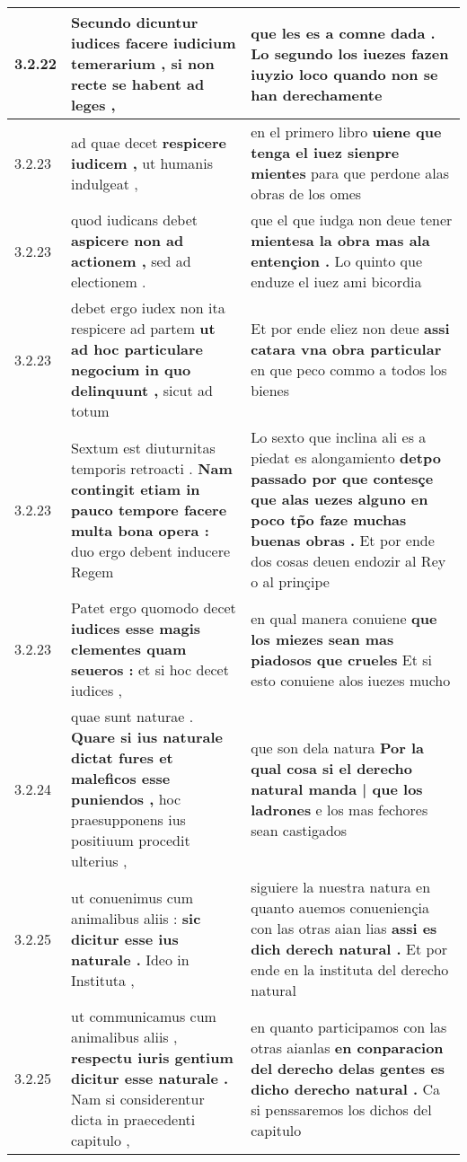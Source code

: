 \begin{tabular}{|p{1cm}|p{6.5cm}|p{6.5cm}|}
3.2.22 & Secundo dicuntur iudices \textbf{ facere iudicium temerarium , } si non recte se habent ad leges , & que les es a comne dada . \textbf{ Lo segundo los iuezes fazen iuyzio loco } quando non se han derechamente \\\hline
3.2.23 & ad quae decet \textbf{ respicere iudicem , } ut humanis indulgeat , & en el primero libro \textbf{ uiene que tenga el iuez sienpre mientes } para que perdone alas obras de los omes \\\hline
3.2.23 & quod iudicans debet \textbf{ aspicere non ad actionem , } sed ad electionem . & que el que iudga non deue tener \textbf{ mientesa la obra mas ala entençion . } Lo quinto que enduze el iuez ami bicordia \\\hline
3.2.23 & debet ergo iudex non ita respicere ad partem \textbf{ ut ad hoc particulare negocium in quo delinquunt , } sicut ad totum & Et por ende eliez non deue \textbf{ assi catara vna obra particular } en que peco commo a todos los bienes \\\hline
3.2.23 & Sextum est diuturnitas temporis retroacti . \textbf{ Nam contingit etiam in pauco tempore facere multa bona opera : } duo ergo debent inducere Regem & Lo sexto que inclina ali es a piedat es alongamiento \textbf{ detpo passado por que contesçe que alas uezes alguno en poco tp̃o faze muchas buenas obras . } Et por ende dos cosas deuen endozir al Rey o al prinçipe \\\hline
3.2.23 & Patet ergo quomodo decet \textbf{ iudices esse magis clementes quam seueros : } et si hoc decet iudices , & en qual manera conuiene \textbf{ que los miezes sean mas piadosos que crueles } Et si esto conuiene alos iuezes mucho \\\hline
3.2.24 & quae sunt naturae . \textbf{ Quare si ius naturale dictat fures et maleficos esse puniendos , } hoc praesupponens ius positiuum procedit ulterius , & que son dela natura \textbf{ Por la qual cosa si el derecho natural manda | que los ladrones } e los mas fechores sean castigados \\\hline
3.2.25 & ut conuenimus cum animalibus aliis : \textbf{ sic dicitur esse ius naturale . } Ideo in Instituta , & siguiere la nuestra natura en quanto auemos conueniençia con las otras aian lias \textbf{ assi es dich derech natural . } Et por ende en la instituta del derecho natural \\\hline
3.2.25 & ut communicamus cum animalibus aliis , \textbf{ respectu iuris gentium dicitur esse naturale . } Nam si considerentur dicta in praecedenti capitulo , & en quanto participamos con las otras aianlas \textbf{ en conparacion del derecho delas gentes es dicho derecho natural . } Ca si penssaremos los dichos del capitulo \\\hline

\end{tabular}
